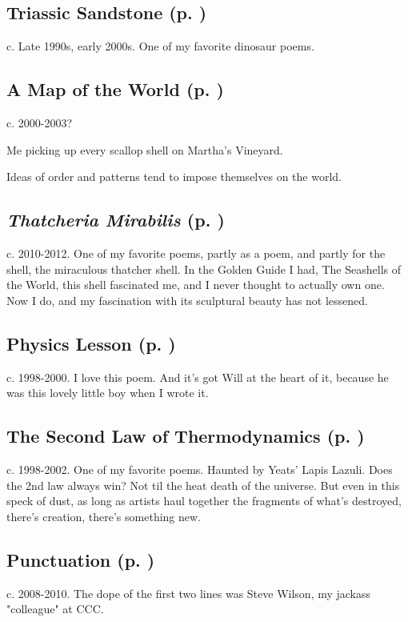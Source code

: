 \subsection*{Triassic Sandstone (p. \pageref{ch:triassic_sandstone})}
c. Late 1990s, early 2000s. One of my favorite dinosaur
poems.

\subsection*{A Map of the World (p. \pageref{ch:a_map_of_the_world})}
c. 2000-2003?

Me picking up every scallop shell on
Martha's Vineyard.

Ideas of order and patterns tend to impose themselves on the world.

\subsection*{\textit{Thatcheria Mirabilis} (p. \pageref{ch:thatcheria_mirabilis})}
c. 2010-2012. One of my favorite poems, partly as a
poem, and partly for the shell, the miraculous thatcher shell. In the
Golden Guide I had, The Seashells of the World, this shell fascinated
me, and I never thought to actually own one. Now I do, and my
fascination with its sculptural beauty has not
lessened.

\subsection*{Physics Lesson (p. \pageref{ch:physics_lesson})}
c. 1998-2000. I love this poem. And it's got Will at the
heart of it, because he was this lovely little boy when I wrote
it.

\subsection*{The Second Law of Thermodynamics (p. \pageref{ch:the_second_law})}
c. 1998-2002. One of my favorite poems. Haunted by
Yeats' Lapis Lazuli. Does the 2nd law always win? Not til the heat death
of the universe. But even in this speck of dust, as long as artists haul
together the fragments of what's destroyed, there's creation, there's
something new.

\subsection*{Punctuation (p. \pageref{ch:punctuation})}
c. 2008-2010. The dope of the first two lines was Steve
Wilson, my jackass "colleague" at CCC.

